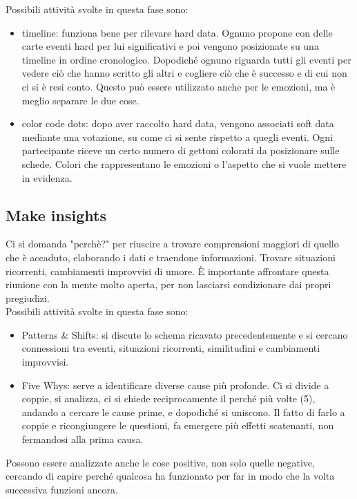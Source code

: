 \noindent Possibili attività svolte in questa fase sono:

\begin{itemize}
    \item timeline: funziona bene per rilevare hard data. Ognuno propone con delle carte eventi hard per lui significativi e poi vengono posizionate su una timeline in ordine cronologico. Dopodiché ognuno riguarda tutti gli eventi per vedere ciò che hanno scritto gli altri e cogliere ciò che è successo e di cui non ci si è resi conto. Questo può essere utilizzato anche per le emozioni, ma è meglio separare le due cose.
    \item color code dots: dopo aver raccolto hard data, vengono associati soft data mediante una votazione, su come ci si sente rispetto a quegli eventi. Ogni partecipante riceve un certo numero di gettoni colorati da posizionare sulle schede. Colori che rappresentano le emozioni o l'aspetto che si vuole mettere in evidenza.
\end{itemize}

\subsection{Make insights}

Ci si domanda "perchè?" per riuscire a trovare comprensioni maggiori di quello che è accaduto, elaborando i dati e traendone informazioni. Trovare situazioni ricorrenti, cambiamenti improvvisi di umore. È importante affrontare questa riunione con la mente molto aperta, per non lasciarsi condizionare dai propri pregiudizi.\\

\noindent Possibili attività svolte in questa fase sono:

\begin{itemize}
    \item Patterns \& Shifts: si discute lo schema ricavato precedentemente e si cercano connessioni tra eventi, situazioni ricorrenti, similitudini e cambiamenti improvvisi.
    \item Five Whys: serve a identificare diverse cause più profonde. Ci si divide a coppie, si analizza, ci si chiede reciprocamente il perché più volte (5), andando a cercare le cause prime, e dopodiché si uniscono. Il fatto di farlo a coppie e ricongiungere le questioni, fa emergere più effetti scatenanti, non fermandosi alla prima causa.
\end{itemize}

\noindent Possono essere analizzate anche le cose positive, non solo quelle negative, cercando di capire perché qualcosa ha funzionato per far in modo che la volta successiva funzioni ancora.

